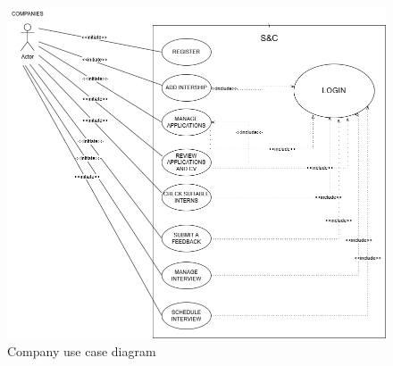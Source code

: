 \begin{figure}[ht!]
    \centering
    \includegraphics[scale=0.40]{Images/ImagesRASD/ScenariosStateDiagram-UseCaseDiagram_Companies.drawio.png}
    \caption{Company use case diagram}

\end{figure}

\clearpage

